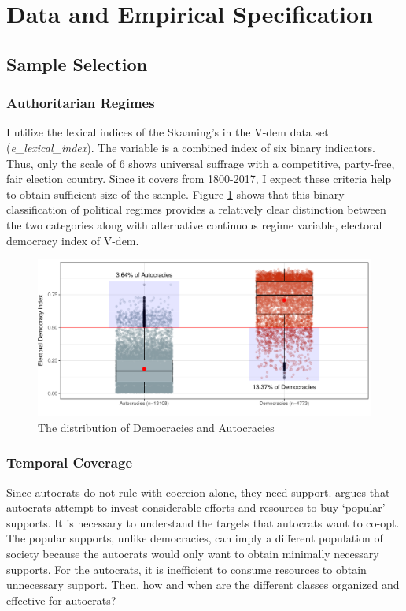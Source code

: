 \documentclass[11pt, notitlepage]{article}
\begin{document}
\section{Data and Empirical Specification}
\subsection{Sample Selection}
\subsubsection{Authoritarian Regimes}

I utilize the lexical indices of the Skaaning's in the V-dem data set (\textit{e\_lexical\_index}). The variable is a combined index of six binary indicators. Thus, only the scale of 6 shows universal suffrage with a competitive, party-free, fair election country. Since it covers from 1800-2017, I expect these criteria help to obtain sufficient size of the sample. Figure \ref{fig:plot1} shows that this binary classification of political regimes provides a relatively clear distinction between the two categories along with alternative continuous regime variable, electoral democracy index of V-dem.\\\par

\begin{figure}[!htbt]
	\centering
	\includegraphics[width=0.85\linewidth]{"../3. Datasets_Codebooks/Figures/Plot1"}
	\caption{The distribution of Democracies and Autocracies}
	\label{fig:plot1}
\end{figure}

\subsubsection{Temporal Coverage}

Since autocrats do not rule with coercion alone, they need support. \citet{Cassani2017a} argues that autocrats attempt to invest considerable efforts and resources to buy `popular' supports. It is necessary to understand the targets that autocrats want to co-opt. The popular supports, unlike democracies, can imply a different population of society because the autocrats would only want to obtain minimally necessary supports. For the autocrats, it is inefficient to consume resources to obtain unnecessary support. Then, how and when are the different classes organized and effective for autocrats? 
\end{document}
